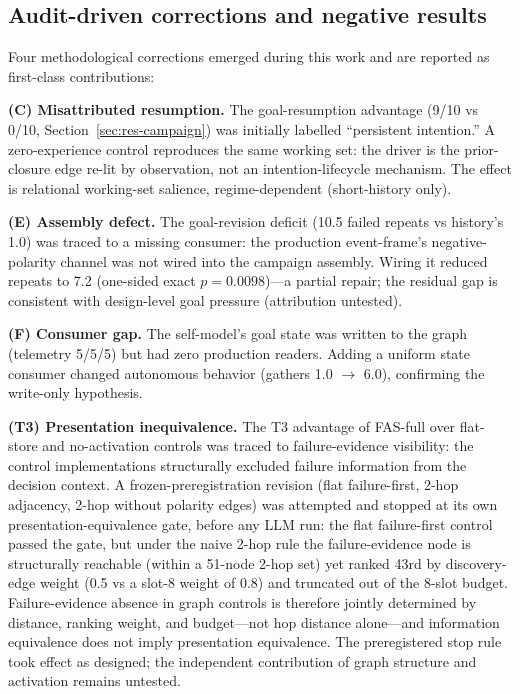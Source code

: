 \documentclass[10pt,a4paper]{article}
\begin{document}
\subsection{Audit-driven corrections and negative results}
\label{sec:audit-negative}

Four methodological corrections emerged during this work and are
reported as first-class contributions:

\textbf{(C) Misattributed resumption.} The goal-resumption advantage
(9/10 vs 0/10, Section~\ref{sec:res-campaign}) was initially labelled
``persistent intention.'' A zero-experience control reproduces the same
working set: the driver is the prior-closure edge re-lit by observation,
not an intention-lifecycle mechanism. The effect is relational
working-set salience, regime-dependent (short-history only).

\textbf{(E) Assembly defect.} The goal-revision deficit (10.5 failed
repeats vs history's 1.0) was traced to a missing consumer: the
production event-frame's negative-polarity channel was not wired into
the campaign assembly. Wiring it reduced repeats to 7.2
(one-sided exact $p{=}0.0098$)---a partial repair; the residual gap is consistent with design-level goal pressure (attribution untested).

\textbf{(F) Consumer gap.} The self-model's goal state was written to
the graph (telemetry 5/5/5) but had zero production readers. Adding a
uniform state consumer changed autonomous behavior (gathers 1.0
$\rightarrow$ 6.0), confirming the write-only hypothesis.

\textbf{(T3) Presentation inequivalence.} The T3 advantage of FAS-full
over flat-store and no-activation controls was traced to
failure-evidence visibility: the control implementations structurally
excluded failure information from the decision context. A
frozen-preregistration revision (flat failure-first, 2-hop adjacency,
2-hop without polarity edges) was attempted and stopped at its own
presentation-equivalence gate, before any LLM run: the flat
failure-first control passed the gate, but under the naive 2-hop rule
the failure-evidence node is structurally reachable (within a 51-node
2-hop set) yet ranked 43rd by discovery-edge weight (0.5 vs a slot-8
weight of 0.8) and truncated out of the 8-slot budget. Failure-evidence
absence in graph controls is therefore jointly determined by distance,
ranking weight, and budget---not hop distance alone---and information
equivalence does not imply presentation equivalence. The preregistered
stop rule took effect as designed; the independent contribution of
graph structure and activation remains untested.
\end{document}
